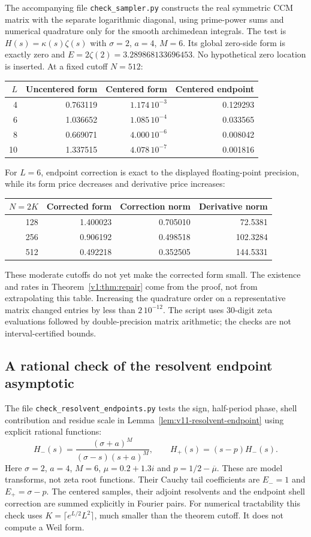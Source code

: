 \documentclass[11pt]{article}
\theoremstyle{remark}
\begin{document}
The accompanying file \texttt{check\_sampler.py} constructs the real symmetric CCM matrix with the
separate logarithmic diagonal, using prime-power sums and numerical
quadrature only for the smooth archimedean integrals. The test is
$H(s)=\kappa(s)\zeta(s)$ with $\sigma=2$, $a=4$, $M=6$. Its global
zero-side form is exactly zero and $E=2\zeta(2)=3.289868133696453$.
No hypothetical zero location is inserted. At a fixed cutoff $N=512$:
\begin{center}
\begin{tabular}{rrrr}
\toprule
$L$ & Uncentered form & Centered form & Centered endpoint\\
\midrule
4 & 0.763119 & $1.174\,10^{-3}$ & 0.129293\\
6 & 1.036652 & $1.085\,10^{-4}$ & 0.033565\\
8 & 0.669071 & $4.000\,10^{-6}$ & 0.008042\\
10 & 1.337515 & $4.078\,10^{-7}$ & 0.001816\\
\bottomrule
\end{tabular}
\end{center}
For $L=6$, endpoint correction is exact to the displayed floating-point
precision, while its form price decreases and derivative price increases:
\begin{center}
\begin{tabular}{rrrr}
\toprule
$N=2K$ & Corrected form & Correction norm & Derivative norm\\
\midrule
128 & 1.400023 & 0.705010 & 72.5381\\
256 & 0.906192 & 0.498518 & 102.3284\\
512 & 0.492218 & 0.352505 & 144.5331\\
\bottomrule
\end{tabular}
\end{center}
These moderate cutoffs do not yet make the corrected form small. The
existence and rates in Theorem~\ref{v1:thm:repair} come from the proof, not
from extrapolating this table. Increasing the quadrature order on a
representative matrix changed entries by less than $2\,10^{-12}$.
The script uses 30-digit zeta evaluations followed by double-precision
matrix arithmetic; the checks are not interval-certified bounds.

\subsection*{A rational check of the resolvent endpoint asymptotic}
The file \texttt{check\_resolvent\_endpoints.py} tests the sign, half-period
phase, shell contribution and residue scale in
Lemma~\ref{lem:v11-resolvent-endpoint} using explicit rational functions:
\[
 H_-(s)=\frac{(\sigma+a)^M}{(\sigma-s)(s+a)^M},
 \qquad H_+(s)=(s-p)H_-(s).
\]
Here $\sigma=2$, $a=4$, $M=6$, $\mu=0.2+1.3i$ and
$p=1/2-\overline\mu$. These are model transforms, not zeta root
functions. Their Cauchy tail coefficients are $E_-=1$ and
$E_+=\sigma-p$. The centered samples, their adjoint resolvents and
the endpoint shell correction are summed explicitly in Fourier pairs.
For numerical tractability this check uses
$K=\lceil e^{L/2}L^2\rceil$, much smaller than the theorem cutoff.
It does not compute a Weil form.
\end{document}
